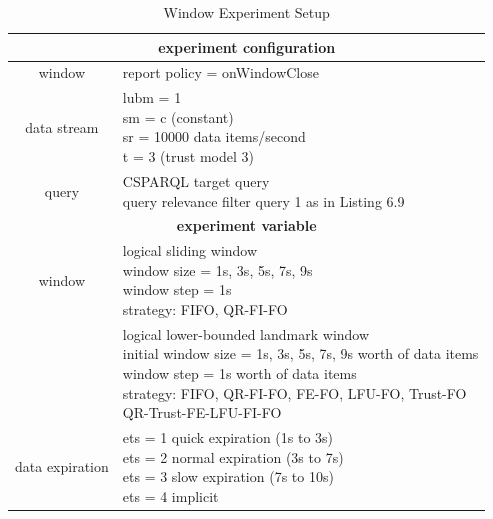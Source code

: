 \begin{table}[!htbp]
	\centering
    \caption{Window Experiment Setup}
    \label{tab:6-wes}
    \begin{tabular}{|c|l|} \hline
    \multicolumn{2}{|c|}{\textbf{experiment configuration}} \\ \hline
    window & report policy = onWindowClose \\ \hline
    data stream & \makecell[l]{lubm = 1 \\ sm = c (constant) \\ sr = 10000 data items/second \\ t = 3 (trust model 3)} \\ \hline
    query & \makecell[l]{CSPARQL target query \\ query relevance filter query 1 as in Listing 6.9} \\ \hline
    \multicolumn{2}{|c|}{\textbf{experiment variable}} \\ \hline
    window & \makecell[l]{logical sliding window \\ window size = 1s, 3s, 5s, 7s, 9s \\ window step = 1s \\ strategy: FIFO, QR-FI-FO} \\ \cline{2-2}
           & \makecell[l]{logical lower-bounded landmark window \\ initial window size = 1s, 3s, 5s, 7s, 9s worth of data items \\ window step = 1s worth of data items \\ strategy: FIFO, QR-FI-FO, FE-FO, LFU-FO, Trust-FO \\ QR-Trust-FE-LFU-FI-FO} \\ \hline
    data expiration & \makecell[l]{ets = 1 quick expiration (1s to 3s) \\ ets = 2 normal expiration (3s to 7s) \\ ets = 3 slow expiration (7s to 10s) \\ ets = 4 implicit} \\ \hline
    \end{tabular}
\end{table}

